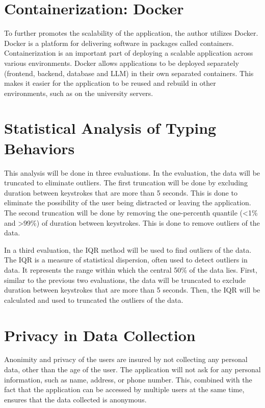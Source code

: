 \section{Containerization: Docker}
To further promotes the scalability of the application, the author utilizes Docker.
Docker is a platform for delivering software in packages called containers.
Containerization is an important part of deploying a scalable application across various environments.
Docker allows applications to be deployed separately (frontend, backend, database and \ac{LLM}) in their own separated containers.
This makes it easier for the application to be reused and rebuild in other environments, such as on the university servers.

\section{Statistical Analysis of Typing Behaviors}

This analysis will be done in three evaluations.
In the evaluation, the data will be truncated to eliminate outliers.
The first truncation will be done by excluding duration between keystrokes that are more than 5 seconds.
This is done to eliminate the possibility of the user being distracted or leaving the application.
The second truncation will be done by removing the one-percenth quantile (\textless1\% and \textgreater99\%) of duration between keystrokes.
This is done to remove outliers of the data.

In a third evaluation, the \ac{IQR} method will be used to find outliers of the data.
The \ac{IQR} is a measure of statistical dispersion, often used to detect outliers in data. 
It represents the range within which the central 50\% of the data lies.
First, similar to the previous two evaluations, the data will be truncated to exclude duration between keystrokes that are more than 5 seconds.
Then, the \ac{IQR} will be calculated and used to truncated the outliers of the data.

\section{Privacy in Data Collection}

Anonimity and privacy of the users are insured by not collecting any personal data, other than the age of the user.
The application will not ask for any personal information, such as name, address, or phone number.
This, combined with the fact that the application can be accessed by multiple users at the same time, ensures that the data collected is anonymous.
